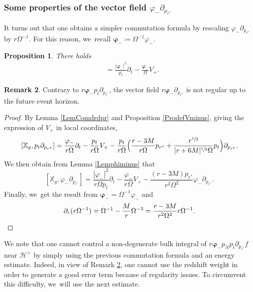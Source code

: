 \documentclass[10pt]{amsart}
\theoremstyle{plain}
\newtheorem{proposition}{Proposition}[section]
\theoremstyle{definition}
\newtheorem{remark}[proposition]{Remark}
\newcommand\T{{\mathbb{X}}}
\renewcommand\H{{\mathcal{H}^+}}
\begin{document}
\subsubsection{Some properties of the vector field $\varphi_- \partial_{p_{r^*}}$}

It turns out that one obtains a simpler commutation formula by rescaling $\varphi_- \partial_{p_{r^*}}$ by $r\Omega^{-1}$. For this reason, we~recall $\pmb{\varphi}_-\coloneqq\Omega^{-1} \varphi_-$.

\begin{proposition}\label{Propartialprstar}
There holds
\begin{align*}
[ \T_g, r\pmb{\varphi}_- \partial_{p_{r^*}}]&=\frac{|\pmb{\varphi}_-|^2}{ p_t} \partial_t-\frac{\pmb{\varphi}_-}{\Omega} V_+.
\end{align*}
\end{proposition}
\begin{remark}\label{Rkregu}
Contrary to $r\pmb{\varphi}_- p_t \partial_{p_{r^*}}$, the vector field $r\pmb{\varphi}_- \partial_{p_{r^*}}$ is not regular up to the future event horizon.
\end{remark}

\begin{proof}
By Lemma \ref{LemComdrdpr} and Proposition \ref{ProdefVminus}, giving the expression of $V_+$ in local coordinates,
\[
[ \T_g, p_t\partial_{p_{r^*}}]=\frac{\varphi_-}{r\Omega} \partial_t-\frac{p_t}{r\Omega} V_+-\frac{p_t}{r\Omega}\Bigl(\frac{r-3M}{r\Omega}p_{r^*}+\frac{r^{\sfrac{1}{2}}}{|r+6M|^{\sfrac{1}{2}} \Omega}p_t \Bigr) \partial_{p_{r^*}}.
\]
We then obtain from Lemma \ref{Lemphiminus} that\vspace*{-3pt}
\[
[ \T_g,\varphi_- \partial_{p_{r^*}}]=\frac{|\varphi_-|^2}{r\Omega p_t} \partial_t-\frac{\varphi_-}{r\Omega} V_+-\frac{(r-3M)p_{r^*}}{r^2\Omega^2}\varphi_- \partial_{p_{r^*}}.
\]
Finally, we~get the result from $\pmb{\varphi}_-=\Omega^{-1}\varphi_-$ and\vspace*{-3pt}
\[
\partial_{r}(r\Omega^{-1})=\Omega^{-1}-\frac{M}{r}\Omega^{-3}=\frac{r-3M}{r^2 \Omega^2}r\Omega^{-1}.\qedhere
\]
\end{proof}

We note that one cannot control a non-degenerate bulk integral of $r\pmb{\varphi}_- p_N p_t\partial_{p_{r^*}}f$ near $\H$ by simply using the previous commutation formula and an energy estimate. Indeed, in view of Remark \ref{Rkregu}, one cannot use the redshift weight in order to generate a good error term because of regularity issues. To circumvent this difficulty, we~will use the next estimate.
\end{document}
